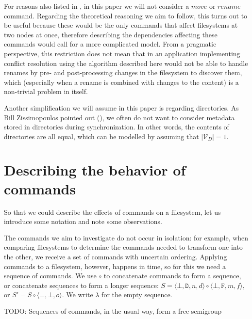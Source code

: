 \documentclass[12pt]{article}
\newcommand{\setvx}[1]{\mathcal{V}_{#1}} %
\newcommand{\setd}{\setvx{D}} %
\newcommand{\empt}{\bot}
\newcommand{\ccharb}{\empt}
\newcommand{\ccharf}{\mathtt{F}}
\newcommand{\cchard}{\mathtt{D}}
\newcommand{\vald}{d} %
\newcommand{\valf}{f} %
\newcommand{\caaa}[3]{\langle{#1,#2,#3}\rangle}
\newcommand{\caaaa}[4]{\langle{#1,#2,#3,#4}\rangle}
\newcommand{\cbba}[1]{\caaa{\ccharb}{\ccharb}{#1}}
\newcommand{\cbfaa}[2]{\caaaa{\ccharb}{\ccharf}{#1}{#2}}
\newcommand{\cbdaa}[2]{\caaaa{\ccharb}{\cchard}{#1}{#2}}
\newcommand{\cc}{\circ} %
\newcommand{\emptyseq}{\lambda} %
\theoremstyle{definition}
\begin{document}

For reasons also listed in \cite{NREC:alg}, in this paper we will not consider
a $move$ or $rename$ command. Regarding the theoretical reasoning we aim to follow,
this turns out to be useful because these would be the only commands that affect
filesystems at two nodes at once, therefore describing 
the dependencies affecting these commands
would call for a more complicated model.
From a pragmatic perspective, this restriction does not mean that in an application
implementing conflict resolution using the algorithm described here would not be
able to handle renames by pre- and post-processing changes in the filesystem to
discover them, which (especially when a rename is combined with changes to the content)
is a non-trivial problem in itself.

Another simplification we will assume in this paper is regarding directories.
As Bill Zissimopoulos pointed out (\cite{BZ}), we often do not want to consider metadata stored in
directories during synchronization. In other words, the contents of directories are all equal,
which can be modelled by assuming that $|\setd|=1$.




\section{Describing the behavior of commands}


So that we could describe the effects of commands on a filesystem, let us introduce some notation
and note some observations.

The commands we aim to investigate do not occur in isolation:
for example, when comparing filesystems to determine the commands needed to transform one into the other,
we receive a set of commands with uncertain ordering.
Applying commands to a filesystem, however, happens in time,
so for this we need a sequence of commands.
We use $\cc$ to concatenate commands to form a sequence, or concatenate sequences to form a longer sequence:
$S=\cbdaa{n}{\vald}\cc\cbfaa{m}{\valf}$, or $S'=S\cc\cbba{o}$.
We write $\emptyseq$ for the empty sequence.

TODO: Sequences of commands, in the usual way,  form a free
semigroup
\end{document}
